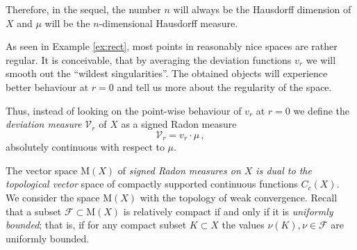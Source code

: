 \documentclass[12pt,leqno,intlimits]{amsart}
\numberwithin{equation}{section}
\theoremstyle{definition}
\theoremstyle{remark}
\newtheorem{ex}[thm]{Example}
\newcommand{\R}{\mathbb{R}}
\begin{document}
{ Therefore, in the sequel, the number $n$ will always be the Hausdorff dimension of $X$ and $\mu$ will be the $n$-dimensional Hausdorff measure.


As seen in Example \ref{ex:rect}, most points in reasonably nice spaces are rather regular.
It is  conceivable, that by averaging  the deviation functions $v_r$ we will smooth out the ``wildest singularities''.
The obtained objects will experience  better behaviour at $r=0$ and tell us more about the  regularity of the space.





Thus, instead of looking on the point-wise behaviour of $v_r$ at $r=0$ we
 define the \emph{deviation measure} $\mathcal{V}_r$ of $X$ as a signed Radon measure \begin{equation} \label{eq:first}
\mathcal{V}_r = v_r \cdot \mu \, ,
\end{equation}
absolutely continuous with respect to $\mu$.}

The vector space  $\mathrm M(X)$ of \emph{signed Radon measures on $X$ is   dual  to the topological  vector} space of compactly supported continuous functions $C_c (X)$.
We consider the space $\mathrm M(X)$ with the topology of weak convergence.
Recall that a subset $\mathcal F \subset \mathrm M(X)$ is relatively compact if and only if
it is \emph{uniformly bounded};
that is, if for any compact subset $K\subset X$ the values $\nu (K), \nu \in \mathcal F$ are uniformly bounded.


\end{document}
